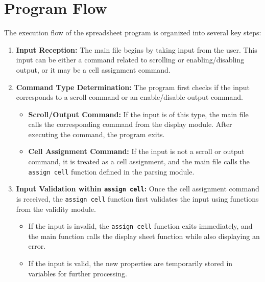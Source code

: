 \documentclass[a4paper,12pt,oneside]{article}
\begin{document}
\section{Program Flow}
The execution flow of the spreadsheet program is organized into several key steps:

\begin{enumerate}
    \item \textbf{Input Reception:}  
    The main file begins by taking input from the user. This input can be either a command related to scrolling or enabling/disabling output, or it may be a cell assignment command.

    \item \textbf{Command Type Determination:}  
    The program first checks if the input corresponds to a scroll command or an enable/disable output command.  
    \begin{itemize}
        \item \textbf{Scroll/Output Command:} If the input is of this type, the main file calls the corresponding command from the display module. After executing the command, the program exits.
        \item \textbf{Cell Assignment Command:} If the input is not a scroll or output command, it is treated as a cell assignment, and the main file calls the \texttt{assign cell} function defined in the parsing module.
    \end{itemize}

    \item \textbf{Input Validation within \texttt{assign cell}:}  
    Once the cell assignment command is received, the \texttt{assign cell} function first validates the input using functions from the validity module.
    \begin{itemize}
        \item If the input is invalid, the \texttt{assign cell} function exits immediately, and the main function calls the display sheet function while also displaying an error.
        \item If the input is valid, the new properties are temporarily stored in variables for further processing.
    \end{itemize}


\end{enumerate}
\end{document}

